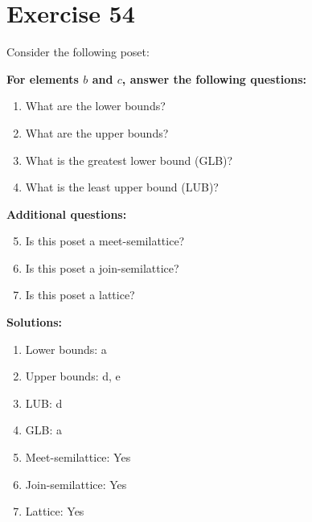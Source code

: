 \documentclass{article}
\begin{document}
\section*{Exercise 54}
Consider the following poset:
\begin{center}
\end{center}

    \textbf{For elements $b$ and $c$, answer the following questions:}
\begin{enumerate}
    \item What are the lower bounds?
    \item What are the upper bounds?
    \item What is the greatest lower bound (GLB)?
    \item What is the least upper bound (LUB)?
\end{enumerate}
    \hspace*{3ex} \textbf{Additional questions:}
\begin{enumerate}
    \setcounter{enumi}{4}
    \item Is this poset a meet-semilattice?
    \item Is this poset a join-semilattice?
    \item Is this poset a lattice?
\end{enumerate}

\textbf{Solutions:}
\begin{enumerate}
    \item Lower bounds: {a}
    \item Upper bounds: {d, e}
    \item LUB: d
    \item GLB: a
    \item Meet-semilattice: Yes
    \item Join-semilattice: Yes
    \item Lattice: Yes
\end{enumerate}
\newpage
\end{document}
